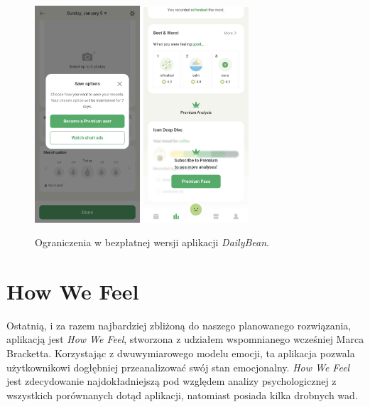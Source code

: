 \documentclass[inz, shortabstract]{iithesis}
\begin{document}
\begin{figure}[!hb]
\centering
\includegraphics[width=0.35\textwidth]{dailybean3.jpg} 
\includegraphics[width=0.35\textwidth]{dailybean5.jpg} 
\caption{Ograniczenia w bezpłatnej wersji aplikacji \textit{DailyBean}.}
\end{figure}

\section{How We Feel}
Ostatnią, i za razem najbardziej zbliżoną do naszego planowanego rozwiązania, aplikacją jest \textit{How We Feel}, stworzona z udziałem wspomnianego wcześniej Marca Bracketta. Korzystając z dwuwymiarowego modelu emocji, ta aplikacja pozwala użytkownikowi dogłębniej przeanalizować swój stan emocjonalny. \textit{How We Feel} jest zdecydowanie najdokładniejszą pod względem analizy psychologicznej z wszystkich porównanych dotąd aplikacji, natomiast posiada kilka drobnych wad. 
\end{document}
